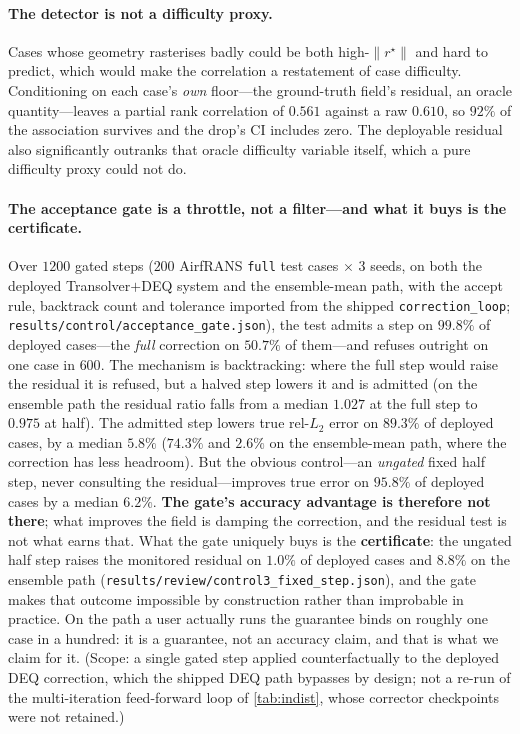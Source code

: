 \paragraph{The detector is not a difficulty proxy.} Cases whose geometry rasterises badly
could be both high-$\|r^\star\|$ and hard to predict, which would make the correlation a
restatement of case difficulty. Conditioning on each case's \emph{own} floor---the
ground-truth field's residual, an oracle quantity---leaves a partial rank correlation of
$0.561$ against a raw $0.610$, so $92\%$ of the association survives and the drop's CI
includes zero. The deployable residual also significantly outranks that oracle difficulty
variable itself, which a pure difficulty proxy could not do.

\paragraph{The acceptance gate is a throttle, not a filter---and what it buys is the
certificate.} Over $1200$ gated steps ($200$ AirfRANS \texttt{full} test cases $\times$ 3
seeds, on both the deployed Transolver$+$DEQ system and the ensemble-mean path, with the
accept rule, backtrack count and tolerance imported from the shipped
\texttt{correction\_loop}; \texttt{results/control/acceptance\_gate.json}), the test admits
a step on \textbf{$99.8\%$} of deployed cases---the \emph{full} correction on $50.7\%$ of
them---and refuses outright on one case in $600$. The mechanism is backtracking: where the
full step would raise the residual it is refused, but a halved step lowers it and is
admitted (on the ensemble path the residual ratio falls from a median $1.027$ at the full
step to $0.975$ at half). The admitted step lowers true rel-$L_2$ error on
\textbf{$89.3\%$} of deployed cases, by a median $\mathbf{5.8\%}$ ($74.3\%$ and $2.6\%$ on
the ensemble-mean path, where the correction has less headroom). But the obvious
control---an \emph{ungated} fixed half step, never consulting the residual---improves true
error on $95.8\%$ of deployed cases by a median $6.2\%$. \textbf{The gate's accuracy
advantage is therefore not there}; what improves the field is damping the correction, and
the residual test is not what earns that. What the gate uniquely buys is the
\textbf{certificate}: the ungated half step raises the monitored residual on $1.0\%$ of
deployed cases and $8.8\%$ on the ensemble path
(\texttt{results/review/control3\_fixed\_step.json}), and the gate makes that outcome
impossible by construction rather than improbable in practice. On the path a user actually
runs the guarantee binds on roughly one case in a hundred: it is a guarantee, not an
accuracy claim, and that is what we claim for it. (Scope: a single gated step applied
counterfactually to the deployed DEQ correction, which the shipped DEQ path bypasses by
design; not a re-run of the multi-iteration feed-forward loop of \autoref{tab:indist},
whose corrector checkpoints were not retained.)


